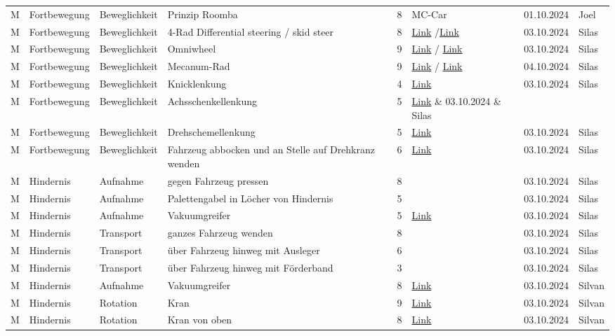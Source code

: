 \documentclass[../main.tex]{subfiles}
\begin{document}
\begin{longtable}{lp{2cm}p{2cm}p{4cm}clcl}
M & Fortbewegung & Beweglichkeit & Prinzip Roomba & 8 & MC-Car & 01.10.2024 & Joel
\tabularnewline
M & Fortbewegung & Beweglichkeit & 4-Rad Differential steering / \newline skid steer & 8 & \href{https://en.wikipedia.org/wiki/Differential_steering}{Link} /\href{https://science.howstuffworks.com/transport/engines-equipment/skid-steer2.htm}{Link} & 03.10.2024 & Silas
\tabularnewline
M & Fortbewegung & Beweglichkeit & Omniwheel & 9 & \href{https://de.wikipedia.org/wiki/Allseitenrad}{Link} / \href{https://www.youtube.com/watch?v=wwQQnSWqB7A}{Link} & 03.10.2024 & Silas
\tabularnewline
M & Fortbewegung & Beweglichkeit & Mecanum-Rad & 9 & \href{https://de.wikipedia.org/wiki/Mecanum-Rad}{Link} / \href{https://www.youtube.com/watch?v=noqBUEgyQ8A}{Link} & 04.10.2024 & Silas
\tabularnewline
M & Fortbewegung & Beweglichkeit & Knicklenkung & 4 & \href{https://de.wikipedia.org/wiki/Knicklenkung}{Link} & 03.10.2024 & Silas
\tabularnewline
M & Fortbewegung & Beweglichkeit & Achsschenkellenkung & 5 & \href{https://de.wikipedia.org/wiki/Achsschenkel#:~:text=Die%20Erfindung%20der%20Achsschenkellenkung%20bedeutete,wird%20bei%20Automobilen%20ausschlie%C3%9Flich%20verwendet.}{Link} & 03.10.2024 & Silas
\tabularnewline
M & Fortbewegung & Beweglichkeit & Drehschemellenkung & 5 & \href{https://www.staplerberater.de/auswahlkriterien/lenkungsarten}{Link} & 03.10.2024 & Silas
\tabularnewline
M & Fortbewegung & Beweglichkeit & Fahrzeug abbocken und an Stelle auf Drehkranz wenden & 6 & \href{https://www.kaiserkraft.ch/hubgeraete/hub-und-verladetische/auto-niveaugeraet-mit-drehscheibe/drehscheiben-1110-mm/p/M1142876/?articleNumber=118558&lang=de_CH&customerType=B2C&lang=&infinity=ict2~net~gaw~cmp~PM_DE-shopping24-Jarvis-0~ag~~ar~~kw~~mt~&gad_source=1&gclid=CjwKCAjwgfm3BhBeEiwAFfxrGxsQhJoEWwY3dNM_OYKFg2NOgoHXLP2OeyLmOZFTVnzHt7PvNpgCbhoCACQQAvD_BwE}{Link} & 03.10.2024 & Silas
\tabularnewline

M & Hindernis & Aufnahme & gegen Fahrzeug pressen & 8 &  & 03.10.2024 & Silas
\tabularnewline
M & Hindernis & Aufnahme & Palettengabel in Löcher von Hindernis  & 5 &  & 03.10.2024 & Silas
\tabularnewline
M & Hindernis & Aufnahme & Vakuumgreifer & 5 & \href{https://www.schmalz.com/de-ch/glossar/vakuumgreifer/}{Link} & 03.10.2024 & Silas
\tabularnewline
M & Hindernis & Transport & ganzes Fahrzeug wenden & 8 &  & 03.10.2024 & Silas
\tabularnewline
M & Hindernis & Transport & über Fahrzeug hinweg mit Ausleger & 6 &  & 03.10.2024 & Silas
\tabularnewline
M & Hindernis & Transport & über Fahrzeug hinweg mit Förderband & 3 &  & 03.10.2024 & Silas
\tabularnewline
M & Hindernis & Aufnahme & Vakuumgreifer & 8 & \href{https://www.youtube.com/shorts/alxwWgzSVss}{Link}& 03.10.2024 & Silvan
\tabularnewline
M & Hindernis & Rotation & Kran & 9 & \href{https://www.youtube.com/watch?v=VZRFHJfUkq4&feature=youtu.be}{Link}& 03.10.2024 & Silvan
\tabularnewline
M & Hindernis & Rotation & Kran von oben & 8 & \href{https://www.youtube.com/watch?v=J7LGSNhFTU4}{Link}& 03.10.2024 & Silvan
\tabularnewline


\end{longtable}
\end{document}
